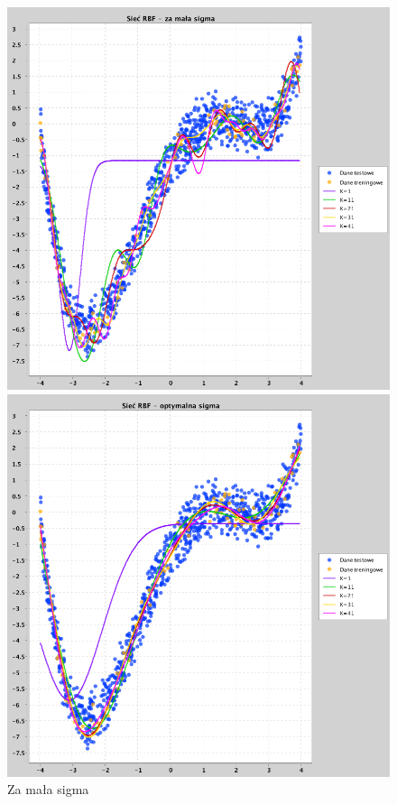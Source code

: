 \documentclass[a4paper, portrait,11pt]{article}
\begin{document}
\begin{figure}[!htb]
  \begin{minipage}{0.33\textwidth}
    \centering
    \includegraphics[width=1\linewidth]{../data/approximation3/1/small.png}
    \caption{\label{fig:1small}Za mała sigma}
  \end{minipage}
  \begin{minipage}{0.33\textwidth}
    \centering
    \includegraphics[width=1\linewidth]{../data/approximation3/1/optimal.png}

\end{minipage}
\end{figure}
\end{document}
